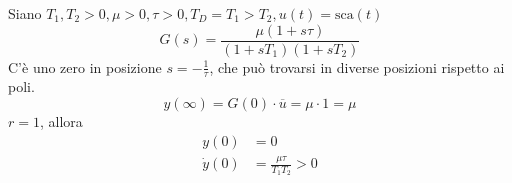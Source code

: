 \documentclass[10pt,a4paper]{book}
\begin{document}
Siano $T_{1} ,T_{2}  >0,\mu  >0,\tau  >0,T_{D} =T_{1}  >T_{2} ,u( t) =\mathrm{sca}( t)$
\begin{equation*}
G(s)=\frac{\mu (1+s\tau )}{( 1+sT_{1})( 1+sT_{2})}
\end{equation*}
C'è uno zero in posizione $s=-\frac{1}{\tau }$, che può trovarsi in diverse posizioni rispetto ai poli.
\begin{equation*}
y( \infty ) =G( 0) \cdotp \overline{u} =\mu \cdotp 1=\mu 
\end{equation*}
$r=1$, allora
\begin{equation*}
\begin{aligned}
y(0) & =0\\
\dot{y} (0) & =\frac{\mu \tau }{T_{1} T_{2}}  >0
\end{aligned}
\end{equation*}
\end{document}
